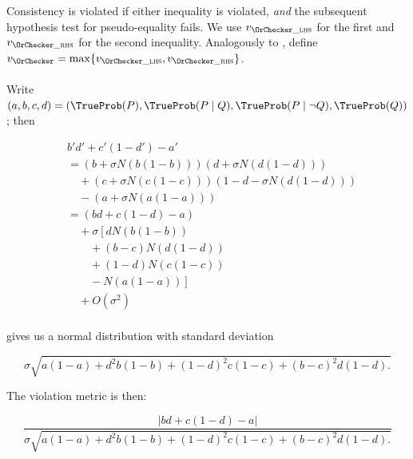 Consistency is violated if either inequality is violated, \emph{and} the subsequent hypothesis test for pseudo-equality fails. We use $v_{\OrChecker\_\textsc{lhs}}$ for the first and  $v_{\OrChecker\_\textsc{rhs}}$ for the second inequality.
Analogously to \AndChecker{}, define $v_{\OrChecker} = \max\{v_{\OrChecker\_\textsc{lhs}}, v_{\OrChecker\_\textsc{rhs}} \}$.

\paragraph{\ExpectedEvidenceChecker}
\label{cfc/app:frequentist-ee}

Write $(a,b,c,d)=(\TrueProb(P),\TrueProb(P\mid Q),\TrueProb(P\mid\lnot Q), \TrueProb(Q))$; then

\begin{align*}
& b'd'+c'(1-d')-a' \\
& =
(b + \sigma N(b(1-b)))(d + \sigma N(d(1-d)))
\\ & \quad +
(c + \sigma N(c(1-c)))(1 - d - \sigma N(d(1-d)))
\\ & \quad - (a+\sigma N(a(1-a))) \\
& = (bd+c(1-d)-a)
\\ & \quad + \sigma \left[
d N(b(1-b))\right. \\
&\quad\quad + (b-c) N(d(1-d)) \\
&\quad\quad + (1-d)N(c(1-c)) \\
&\left.\quad\quad - N(a(1-a))
\right]
\\ & \quad + O(\sigma^2) \\
\end{align*}

gives us a normal distribution with standard deviation

\begin{equation*}
\sigma\sqrt{
a(1-a)
+ d^2 b (1-b)
+ (1-d)^2 c (1-c)
+ (b-c)^2 d (1-d).
}
\end{equation*}

The violation metric is then:

\begin{equation*}
\frac{
|bd+c(1-d)-a|
}{
\sigma\sqrt{
a(1-a)
+ d^2 b (1-b)
+ (1-d)^2 c (1-c)
+ (b-c)^2 d (1-d).
}
}
\end{equation*}

